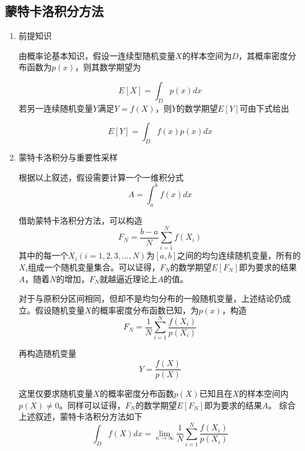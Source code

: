 \documentclass[lang=cn,10pt]{elegantbook}
\begin{document}
\subsection{蒙特卡洛积分方法}
\begin{enumerate}[itemsep=1.5ex]
  \item 前提知识

\quad 由概率论基本知识，假设一连续型随机变量$X$的样本空间为$D$，其概率密度分布函数为$p(x)$，则其数学期望为

\begin{equation}\label{eu_eqn}
E[X]=\int_Dp(x)dx
\end{equation}
若另一连续随机变量$Y$满足$Y=f(X)$，则$Y$的数学期望$E[Y]$可由下式给出

\begin{equation}\label{eu_eqn}
E[Y]=\int_Df(x)p(x)dx
\end{equation}


  \item 蒙特卡洛积分与重要性采样
  
  \quad 根据以上叙述，假设需要计算一个一维积分式
  \begin{equation}\label{eu_eqn}
A=\int_a^bf(x)dx
\end{equation}
 
借助蒙特卡洛积分方法，可以构造
\begin{equation}\label{eu_eqn}
F_N=\frac{b-a}{N}\sum_{i=1}^Nf(X_i)
\end{equation}
其中的每一个$X_i(i=1,2,3,...,N)$为$[a,b]$之间的均匀连续随机变量，所有的$X_i$组成一个随机变量集合。可以证得，$F_N$的数学期望$E[F_N]$即为要求的结果$A$，随着$N$的增加，$F_N$就越逼近理论上$A$的值。

\vspace{12pt}
\quad 对于与原积分区间相同，但却不是均匀分布的一般随机变量，上述结论仍成立。假设随机变量$X$的概率密度分布函数已知，为$p(x)$，构造
\begin{equation}\label{eu_eqn}
F_N=\frac{1}{N}\sum_{i=1}^{N}\frac{f(X_i)}{p(X_i)}
\end{equation}

再构造随机变量
\begin{equation}
Y=\frac{f(X)}{p(X)}
\end{equation}

这里仅要求随机变量$X$的概率密度分布函数$p(X)$已知且在$X$的样本空间内$p(X)\neq0$。同样可以证得，$F_N$的数学期望$E[F_N]$即为要求的结果$A$。
\vspace{12pt}
\quad 综合上述叙述，蒙特卡洛积分方法如下
\begin{equation}\label{eu_eqn}
\int_Df(X)dx=\lim_{n \to \infty}\frac{1}{N}\sum_{i=1}^{N}\frac{f(X_i)}{p(X_i)}
\end{equation}



\end{enumerate}
\end{document}
